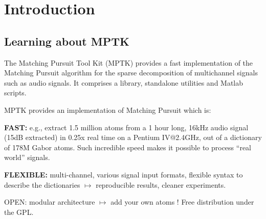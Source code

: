 \chapter{Introduction}

\section{Learning about MPTK}
	
The Matching Pursuit Tool Kit (MPTK) provides a fast implementation of the Matching Pursuit algorithm for 
the sparse decomposition of multichannel signals such as audio signals. It comprises a library, standalone 
utilities and Matlab scripts.

MPTK provides an implementation of Matching Pursuit which is: 

\begin{my_itemize}
	\item \textbf{FAST:} e.g., extract 1.5 million atoms from a 1 hour long, 16kHz audio signal (15dB extracted) in 0.25x 
	real time on a Pentium IV@2.4GHz, out of a dictionary of 178M Gabor atoms. Such incredible speed makes it 
	possible to process ``real world'' signals.
	\item \textbf{FLEXIBLE:} multi-channel, various signal input formats, flexible syntax to describe the dictionaries 
	$\mapsto$ reproducible results, cleaner experiments. 
	\item OPEN: modular architecture $\mapsto$ add your own atoms ! Free distribution under the GPL. 
\end{my_itemize}

